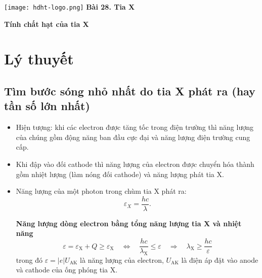\newcommand{\chapter}[2][]{
	\newcommand{\chapname}{#2}
	\begin{flushleft}
		\begin{minipage}[t]{\linewidth}
			\texttt{[image: hdht-logo.png]}
			\hspace{0pt}	
			\sffamily\bfseries\large Bài  28. Tia X
			\begin{flushleft}
				\huge\bfseries #1
			\end{flushleft}
		\end{minipage}
	\end{flushleft}
	\vspace{1cm}
	\normalfont\normalsize
}
\chapter[Tính chất hạt của tia X]{Tính chất hạt của tia X \footnotetext{Dạng bài tập này sử dụng các kiến thức của chương \textit{Lượng tử ánh sáng}}}

\section{Lý thuyết}

\subsection{Tìm bước sóng nhỏ nhất do tia X phát ra (hay tần số lớn nhất)}

\begin{itemize}
\item Hiện tượng: khi các electron được tăng tốc trong điện trường thì năng lượng của chúng gồm động năng ban đầu cực đại và năng lượng điện trường cung cấp.
\item Khi đập vào đối cathode thì năng lượng của electron được chuyển hóa thành gồm nhiệt lượng (làm nóng đối cathode) và năng lượng  phát tia X.
\item Năng lượng của một photon trong chùm tia X phát ra:
\begin{equation}
	\varepsilon_X =\dfrac{hc}{\lambda}.
\end{equation}

\textbf{Năng lượng dòng electron bằng tổng năng lượng tia X và nhiệt năng} 
\begin{equation}
	\varepsilon = \varepsilon_{\text{X}}+ Q \geq \varepsilon_{\text{X}} \quad\Leftrightarrow\quad \dfrac{hc}{\lambda_\text{X}} \leq \varepsilon  \quad\Rightarrow\quad \lambda_{\text{X}} \geq \dfrac{hc}{\varepsilon}
\end{equation}
trong đó $\varepsilon = |e|U_{\text{AK}}$ là năng lượng của electron, $U_{\text{AK}}$ là điện áp đặt vào anode và cathode của ống phóng tia X.
\end{itemize}

